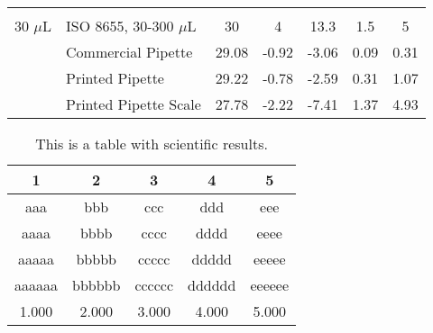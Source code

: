 \documentclass{nature}
\begin{document}
\begin{table}
\begin{adjustwidth}{-0.75in}{0in}
\begin{tabular}{llccccc}
&                       &        &                  &              &              &               \\
30 $\mu$L  & ISO 8655, 30-300 $\mu$L   & 30     & 4                & 13.3         & 1.5          & 5             \\
& Commercial Pipette    & 29.08  & -0.92            & -3.06        & 0.09         & 0.31          \\
& Printed Pipette       & 29.22  & -0.78            & -2.59        & 0.31         & 1.07          \\
& Printed Pipette Scale & 27.78  & -2.22            & -7.41        & 1.37         & 4.93          \\        
\end{tabular}
\end{adjustwidth}
\end{table}

\begin{table}
\centering
\caption{This is a table with scientific results.}
\medskip
\begin{tabular}{ccccc}
\hline
1 & 2 & 3 & 4 & 5\\
\hline
aaa & bbb & ccc & ddd & eee\\
aaaa & bbbb & cccc & dddd & eeee\\
aaaaa & bbbbb & ccccc & ddddd & eeeee\\
aaaaaa & bbbbbb & cccccc & dddddd & eeeeee\\
1.000 & 2.000 & 3.000 & 4.000 & 5.000\\
\hline
\end{tabular}
\end{table}
\end{document}
